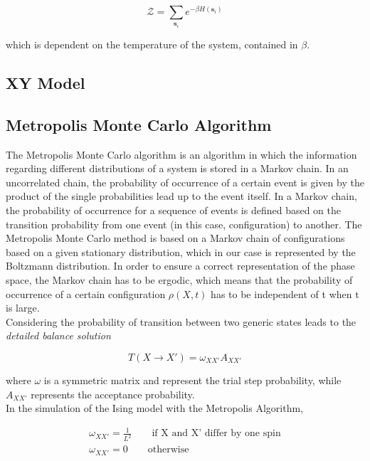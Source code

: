 \documentclass[twoside]{article}
\begin{document}
\begin{multicols}{2}
\begin{equation}
\mathcal{Z} = \sum_{\textbf{s}_i} e^{-\beta H\left(\textbf{s}_i\right)}
\end{equation}

which is dependent on the temperature of the system, contained in $\beta$.

\subsection{XY Model}

\subsection{Metropolis Monte Carlo Algorithm}
The Metropolis Monte Carlo algorithm is an algorithm in which the information regarding different distributions of a system is stored in a Markov chain. 
In an uncorrelated chain, the probability of occurrence of a certain event is given by the product of the single probabilities lead up to the event itself. In a Markov chain, the probability of occurrence for a sequence of events is defined based on the transition probability from one event (in this case, configuration) to another.
The Metropolis Monte Carlo method is based on a Markov chain of configurations based on a given stationary distribution, which in our case is represented by the Boltzmann distribution. In order to ensure a correct representation of the phase space, the Markov chain has to be ergodic, which means that the probability of occurrence of a certain configuration $\rho(X, t)$ has to be independent of t when t is large. \\
Considering the probability of transition between two generic states leads to the \emph{detailed balance solution}

\begin{equation}
T(X \rightarrow X') = \omega_{XX'}A_{XX'}
\end{equation}

where \textbf{$\omega$} is a symmetric matrix and represent the trial step probability, while $A_{XX'}$ represents the acceptance probability. \\
In the simulation of the Ising model with the Metropolis Algorithm, 

\begin{align}
\omega_{XX'} = \frac{1}{L^2} \qquad \text{if X and X' differ by one spin} \\
\omega_{XX'} = 0 \qquad  \text{otherwise} 
\end{align}


\end{multicols}
\end{document}
